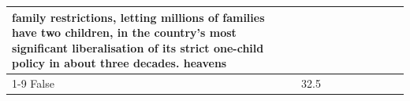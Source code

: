 \begin{table}[H]
\begin{tabular}{lllrlllll}
family restrictions, letting millions of families have two children, in the country's most significant liberalisation of its strict one-child policy in about three decades. heavens \\
\cline{1-9}
False & 32.5%
\end{tabular}
\end{table}
